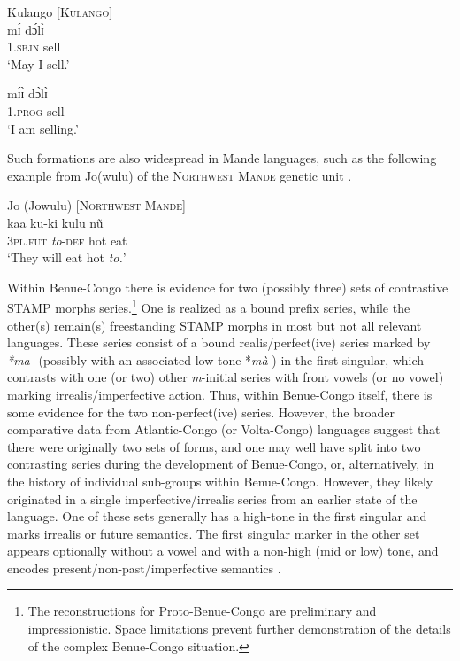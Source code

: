 \documentclass[output=paper]{langsci/langscibook}
\begin{document}
\ea\label{ex:anderson:69}
Kulango \citep[193]{Elders2007}            \textsc{[Kulango]}\\
\ea\label{ex:anderson:69a}
\gll m\'ɪ   d\'ɔl\`ɪ\\
  \textsc{1.sbjn}  sell\\
\glt `May I sell.'    

\ex \label{ex:anderson:69b}
\gll   m\'ɪ\`ɪ   d\`ɔl\`ɪ\\
  1.\textsc{prog}  sell\\
  \glt `I am selling.'  
\z
\z

Such formations are also widespread in Mande languages, such as the following example from Jo(wulu) of the \textsc{Northwest Mande} genetic unit .

\ea\label{ex:anderson:70}
Jo (Jowulu) \citep[11]{Kim2002}          [\textsc{Northwest Mande}]  \\
\gll kaa    ku-ki  kulu  n\~u  \\
\textsc{3pl.fut}  \textit{to}-\textsc{def}  hot  eat    \\
\glt `They will eat hot \textit{to.}'        
\z

Within Benue-Congo there is evidence for two (possibly three) sets of contrastive STAMP morphs series.\footnote{The reconstructions for Proto-Benue-Congo are preliminary and impressionistic. Space limitations prevent further demonstration of the details of the complex Benue-Congo situation.} One is realized as a bound prefix series, while the other(s) remain(s) freestanding STAMP morphs in most but not all relevant languages. These series consist of a bound realis/perfect(ive) series marked by \textit{*}\textit{ma-} (possibly with an associated low tone *\textit{mà}-) in the first singular, which contrasts with one (or two) other \textit{m}-initial series with front vowels (or no vowel) marking irrealis/imperfective action. Thus, within Benue-Congo itself, there is some evidence for the two non-perfect(ive) series. However, the broader comparative data from Atlantic-Congo (or Volta-Congo) languages suggest that there were originally two sets of forms, and one may well have split into two contrasting series during the development of Benue-Congo, or, alternatively, in the history of individual sub-groups within Benue-Congo. However, they likely originated in a single imperfective/irrealis series from an earlier state of the language. One of these sets generally has a high-tone in the first singular and marks irrealis or future semantics. The first singular marker in the other set appears optionally without a vowel and with a non-high (mid or low) tone, and encodes present/non-past/imperfective semantics .
\end{document}
